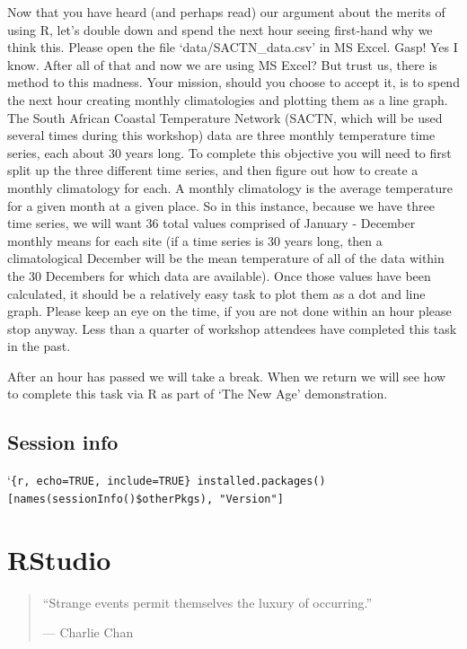 \documentclass[
]{book}
\begin{document}
Now that you have heard (and perhaps read) our argument about the merits of using R, let's double down and spend the next hour seeing first-hand why we think this. Please open the file `data/SACTN\_data.csv' in MS Excel. Gasp! Yes I know. After all of that and now we are using MS Excel? But trust us, there is method to this madness. Your mission, should you choose to accept it, is to spend the next hour creating monthly climatologies and plotting them as a line graph. The South African Coastal Temperature Network (SACTN, which will be used several times during this workshop) data are three monthly temperature time series, each about 30 years long. To complete this objective you will need to first split up the three different time series, and then figure out how to create a monthly climatology for each. A monthly climatology is the average temperature for a given month at a given place. So in this instance, because we have three time series, we will want 36 total values comprised of January - December monthly means for each site (if a time series is 30 years long, then a climatological December will be the mean temperature of all of the data within the 30 Decembers for which data are available). Once those values have been calculated, it should be a relatively easy task to plot them as a dot and line graph. Please keep an eye on the time, if you are not done within an hour please stop anyway. Less than a quarter of workshop attendees have completed this task in the past.

After an hour has passed we will take a break. When we return we will see how to complete this task via R as part of `The New Age' demonstration.

\hypertarget{session-info}{%
\section{Session info}\label{session-info}}

`\texttt{\{r,\ echo=TRUE,\ include=TRUE\}\ installed.packages(){[}names(sessionInfo()\$otherPkgs),\ "Version"{]}}

\hypertarget{rstudio}{%
\chapter{RStudio}\label{rstudio}}

\begin{quote}
``Strange events permit themselves the luxury of occurring.''

--- Charlie Chan
\end{quote}
\end{document}
